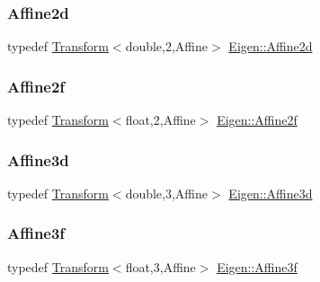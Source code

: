 \subsubsection{\texorpdfstring{Affine2d}{Affine2d}}
{\footnotesize\ttfamily typedef \mbox{\hyperlink{class_eigen_1_1_transform}{Transform}}$<$double,2,Affine$>$ \mbox{\hyperlink{group___geometry___module_gac1c9dbf666dc310b51253302a01136fe}{Eigen\+::\+Affine2d}}}

\mbox{\label{group___geometry___module_gae90bfea5b980efcaadf9168ae6481d11}} 
\subsubsection{\texorpdfstring{Affine2f}{Affine2f}}
{\footnotesize\ttfamily typedef \mbox{\hyperlink{class_eigen_1_1_transform}{Transform}}$<$float,2,Affine$>$ \mbox{\hyperlink{group___geometry___module_gae90bfea5b980efcaadf9168ae6481d11}{Eigen\+::\+Affine2f}}}

\mbox{\label{group___geometry___module_gab0c57680a4d0de53bc749378b0320175}} 
\subsubsection{\texorpdfstring{Affine3d}{Affine3d}}
{\footnotesize\ttfamily typedef \mbox{\hyperlink{class_eigen_1_1_transform}{Transform}}$<$double,3,Affine$>$ \mbox{\hyperlink{group___geometry___module_gab0c57680a4d0de53bc749378b0320175}{Eigen\+::\+Affine3d}}}

\mbox{\label{group___geometry___module_ga3902f2f19737ec9f16189e218919c505}} 
\subsubsection{\texorpdfstring{Affine3f}{Affine3f}}
{\footnotesize\ttfamily typedef \mbox{\hyperlink{class_eigen_1_1_transform}{Transform}}$<$float,3,Affine$>$ \mbox{\hyperlink{group___geometry___module_ga3902f2f19737ec9f16189e218919c505}{Eigen\+::\+Affine3f}}}

